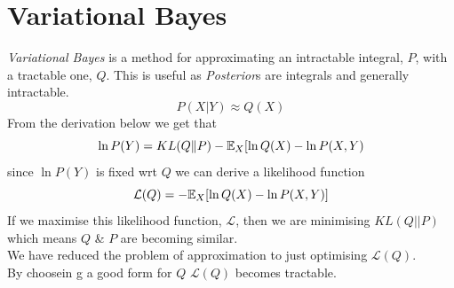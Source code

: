 \documentclass[11pt,a4paper]{article}
\begin{document}
\newcommand{\definition}[1]{\stepcounter{definition} \textbf{Definition \arabic{section}.\arabic{definition}\ - }\textit{#1}\\}
\newcommand{\definitionn}[1]{\stepcounter{definition} \textbf{Definition \arabic{section}.\arabic{definition}\ - }\textit{#1}}
\newcommand{\proof}[1]{\stepcounter{proof} \textbf{Proof \arabic{section}.\arabic{proof}\ - }\textit{#1}\\}
\newcommand{\prooff}[1]{\stepcounter{proof} \textbf{Proof \arabic{section}.\arabic{proof}\ - }\textit{#1}}
\newcommand{\example}[1]{\stepcounter{example} \textbf{Example \arabic{section}.\arabic{example}\ - }\textit{#1}\\}
\newcommand{\examplee}[1]{\stepcounter{example} \textbf{Example \arabic{section}.\arabic{example}\ - }\textit{#1}}
\newcommand{\notation}[1]{\stepcounter{notation} \textbf{Notation \arabic{section}.\arabic{notation}\ - }\textit{#1}\\}
\newcommand{\notationn}[1]{\stepcounter{notation} \textbf{Notation \arabic{section}.\arabic{notation}\ - }\textit{#1}}
\newcommand{\proposition}[1]{\stepcounter{proposition} \textbf{Proposition \arabic{section}.\arabic{proposition}\ - }\textit{#1}\\}
\newcommand{\propositionn}[1]{\stepcounter{proposition} \textbf{Proposition \arabic{section}.\arabic{proposition}\ - }\textit{#1}}
\newcommand{\remark}[1]{\stepcounter{remark} \textbf{Remark \arabic{section}.\arabic{remark}\ - }\textit{#1}\\}
\newcommand{\remarkk}[1]{\stepcounter{remark} \textbf{Remark \arabic{section}.\arabic{remark}\ - }\textit{#1}}
\newcommand{\theorem}[1]{\stepcounter{theorem} \textbf{Theorem \arabic{section}.\arabic{theorem}\ - }\textit{#1}\\}
\newcommand{\theoremm}[1]{\stepcounter{theorem} \textbf{Theorem \arabic{section}.\arabic{theorem}\ - }\textit{#1}}

\section{Variational Bayes}
\textit{Variational Bayes} is a method for approximating an intractable integral, $P$, with a tractable one, $Q$. This is useful as \textit{Posterior}s are integrals and generally intractable.
$$P(X|Y)\approx Q(X)$$
From the derivation below we get that
$$\ln P(Y)=KL(Q\|P)-\mathbb{E}_X[\ln Q(X)-\ln P(X,Y)$$
since $\ln P(Y)$ is fixed wrt $Q$ we can derive a likelihood function
$$\mathcal{L}(Q)=-\mathbb{E}_X[\ln Q(X)-\ln P(X,Y)]$$
If we maximise this likelihood function, $\mathcal{L}$, then we are minimising $KL(Q||P)$ which means $Q$ \& $P$ are becoming similar.\\
We have reduced the problem of approximation to just optimising $\mathcal{L}(Q)$.\\
By choosein g a good form for $Q$ $\mathcal{L}(Q)$ becomes tractable.
\end{document}

